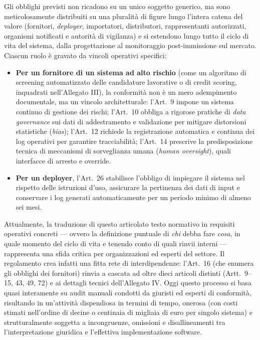 \documentclass[12pt,a4paper,oneside]{report}
\begin{document}
Gli obblighi previsti non ricadono su un unico soggetto generico, ma sono meticolosamente distribuiti su una pluralità di figure lungo l'intera catena del valore (fornitori, \textit{deployer}, importatori, distributori, rappresentanti autorizzati, organismi notificati e autorità di vigilanza) e si estendono lungo tutto il ciclo di vita del sistema, dalla progettazione al monitoraggio post-immissione sul mercato. Ciascun ruolo è gravato da vincoli operativi specifici:
\begin{itemize}
    \item \textbf{Per un fornitore di un sistema ad alto rischio} (come un algoritmo di screening automatizzato delle candidature lavorative o di credit scoring, inquadrati nell'Allegato III), la conformità non è un mero adempimento documentale, ma un vincolo architetturale: l'Art.~9 impone un sistema continuo di gestione dei rischi; l'Art.~10 obbliga a rigorose pratiche di \textit{data governance} sui dati di addestramento e validazione per mitigare distorsioni statistiche (\textit{bias}); l'Art.~12 richiede la registrazione automatica e continua dei log operativi per garantire tracciabilità; l'Art.~14 prescrive la predisposizione tecnica di meccanismi di sorveglianza umana (\textit{human oversight}), quali interfacce di arresto e override.
    \item \textbf{Per un deployer}, l'Art.~26 stabilisce l'obbligo di impiegare il sistema nel rispetto delle istruzioni d'uso, assicurare la pertinenza dei dati di input e conservare i log generati automaticamente per un periodo minimo di almeno sei mesi.
\end{itemize}

Attualmente, la traduzione di questo articolato testo normativo in requisiti operativi concreti — ovvero la definizione puntuale di \textit{chi} debba fare \textit{cosa}, in quale momento del ciclo di vita e tenendo conto di quali rinvii interni — rappresenta una sfida critica per organizzazioni ed esperti del settore. Il regolamento crea infatti una fitta rete di interdipendenze: l'Art.~16 (che enumera gli obblighi dei fornitori) rinvia a cascata ad oltre dieci articoli distinti (Artt.~9--15, 43, 49, 72) e ai dettagli tecnici dell'Allegato IV. Oggi questo processo si basa quasi interamente su audit manuali condotti da giuristi ed esperti di conformità, risultando in un'attività dispendiosa in termini di tempo, onerosa (con costi stimati nell'ordine di decine o centinaia di migliaia di euro per singolo sistema) e strutturalmente soggetta a incongruenze, omissioni e disallineamenti tra l'interpretazione giuridica e l'effettiva implementazione software.
\end{document}
